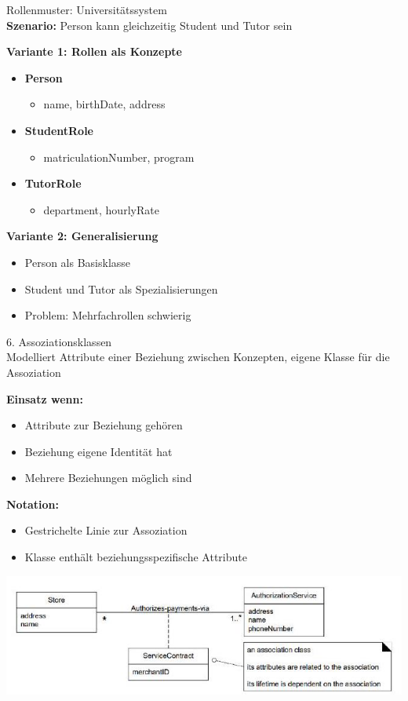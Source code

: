 \begin{example2}{Rollenmuster: Universitätssystem}\\
\textbf{Szenario:} Person kann gleichzeitig Student und Tutor sein

\textbf{Variante 1: Rollen als Konzepte}
\begin{itemize}
    \item \textbf{Person}
    \begin{itemize}
        \item name, birthDate, address
    \end{itemize}
    \item \textbf{StudentRole}
    \begin{itemize}
        \item matriculationNumber, program
    \end{itemize}
    \item \textbf{TutorRole}
    \begin{itemize}
        \item department, hourlyRate
    \end{itemize}
\end{itemize}

\textbf{Variante 2: Generalisierung}
\begin{itemize}
    \item Person als Basisklasse
    \item Student und Tutor als Spezialisierungen
    \item Problem: Mehrfachrollen schwierig
\end{itemize}
\end{example2}

\begin{concept}{6. Assoziationsklassen}\\
Modelliert Attribute einer Beziehung zwischen Konzepten, eigene Klasse für die Assoziation

\textbf{Einsatz wenn:}
\begin{itemize}
    \item Attribute zur Beziehung gehören
    \item Beziehung eigene Identität hat
    \item Mehrere Beziehungen möglich sind
\end{itemize}

\textbf{Notation:}
\begin{itemize}
    \item Gestrichelte Linie zur Assoziation
    \item Klasse enthält beziehungsspezifische Attribute
\end{itemize}
\includegraphics[width=\linewidth]{images/2024_12_29_0d1d7b5551ea1b4b41bdg-07}
\end{concept}


